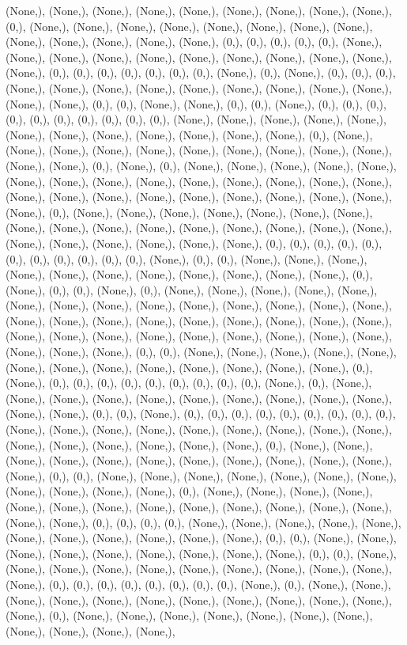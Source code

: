 \documentclass{article}
\begin{document}
(None,), (None,), (None,), (None,), (None,), (None,), (None,), (None,), (None,), (0,), (None,), (None,), (None,), (None,), (None,), (None,), (None,), (None,), (None,), (None,), (None,), (None,), (None,), (0,), (0,), (0,), (0,), (0,), (None,), (None,), (None,), (None,), (None,), (None,), (None,), (None,), (None,), (None,), (None,), (0,), (0,), (0,), (0,), (0,), (0,), (0,), (None,), (0,), (None,), (0,), (0,), (0,), (None,), (None,), (None,), (None,), (None,), (None,), (None,), (None,), (None,), (None,), (None,), (0,), (0,), (None,), (None,), (0,), (0,), (None,), (0,), (0,), (0,), (0,), (0,), (0,), (0,), (0,), (0,), (0,), (None,), (None,), (None,), (None,), (None,), (None,), (None,), (None,), (None,), (None,), (None,), (None,), (0,), (None,), (None,), (None,), (None,), (None,), (None,), (None,), (None,), (None,), (None,), (None,), (None,), (0,), (None,), (0,), (None,), (None,), (None,), (None,), (None,), (None,), (None,), (None,), (None,), (None,), (None,), (None,), (None,), (None,), (None,), (None,), (None,), (None,), (None,), (None,), (None,), (None,), (None,), (None,), (0,), (None,), (None,), (None,), (None,), (None,), (None,), (None,), (None,), (None,), (None,), (None,), (None,), (None,), (None,), (None,), (None,), (None,), (None,), (None,), (None,), (None,), (None,), (0,), (0,), (0,), (0,), (0,), (0,), (0,), (0,), (0,), (0,), (0,), (None,), (0,), (0,), (None,), (None,), (None,), (None,), (None,), (None,), (None,), (None,), (None,), (None,), (None,), (0,), (None,), (0,), (0,), (None,), (0,), (None,), (None,), (None,), (None,), (None,), (None,), (None,), (None,), (None,), (None,), (None,), (None,), (None,), (None,), (None,), (None,), (None,), (None,), (None,), (None,), (None,), (None,), (None,), (None,), (None,), (None,), (None,), (None,), (None,), (None,), (None,), (None,), (None,), (None,), (None,), (0,), (0,), (None,), (None,), (None,), (None,), (None,), (None,), (None,), (None,), (None,), (None,), (None,), (None,), (None,), (0,), (None,), (0,), (0,), (0,), (0,), (0,), (0,), (0,), (0,), (0,), (None,), (0,), (None,), (None,), (None,), (None,), (None,), (None,), (None,), (None,), (None,), (None,), (None,), (None,), (0,), (0,), (None,), (0,), (0,), (0,), (0,), (0,), (0,), (0,), (0,), (0,), (None,), (None,), (None,), (None,), (None,), (None,), (None,), (None,), (None,), (None,), (None,), (None,), (None,), (None,), (None,), (0,), (None,), (None,), (None,), (None,), (None,), (None,), (None,), (None,), (None,), (None,), (None,), (None,), (0,), (0,), (None,), (None,), (None,), (None,), (None,), (None,), (None,), (None,), (None,), (None,), (None,), (0,), (None,), (None,), (None,), (None,), (None,), (None,), (None,), (None,), (None,), (None,), (None,), (None,), (None,), (None,), (None,), (0,), (0,), (0,), (0,), (None,), (None,), (None,), (None,), (None,), (None,), (None,), (None,), (None,), (None,), (None,), (0,), (0,), (None,), (None,), (None,), (None,), (None,), (None,), (None,), (None,), (None,), (0,), (0,), (None,), (None,), (None,), (None,), (None,), (None,), (None,), (None,), (None,), (None,), (None,), (0,), (0,), (0,), (0,), (0,), (0,), (0,), (0,), (None,), (0,), (None,), (None,), (None,), (None,), (None,), (None,), (None,), (None,), (None,), (None,), (None,), (None,), (0,), (None,), (None,), (None,), (None,), (None,), (None,), (None,), (None,), (None,), (None,), (None,), 
\end{document}
